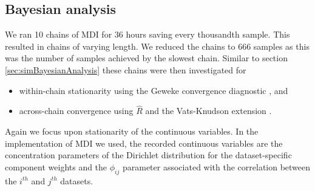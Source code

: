 \documentclass[]{article}
\begin{document}
\subsection{Bayesian analysis} \label{sec:yeastBayesianAnalysis}
We ran 10 chains of MDI for 36 hours saving every thousandth sample. This resulted in chains of varying length. We reduced the chains to 666 samples as this was the number of samples achieved by the slowest chain. Similar to section \ref{sec:simBayesianAnalysis} these chains were then investigated for 
\begin{itemize}
	\item within-chain stationarity using the Geweke convergence diagnostic \citep{geweke1991evaluating}, and
	\item across-chain convergence using $\hat{R}$ \citep{gelman1992inference} and the Vats-Knudson extension \citep[\emph{stable $\hat{R}$},][]{vats2018revisiting}.
\end{itemize}
%
%
Again we focus upon stationarity of the continuous variables. In the implementation of MDI we used, the recorded continuous variables are the concentration parameters of the Dirichlet distribution for the dataset-specific component weights and the $\phi_{ij}$ parameter associated with the correlation between the $i^{th}$ and $j^{th}$ datasets. 
\end{document}
